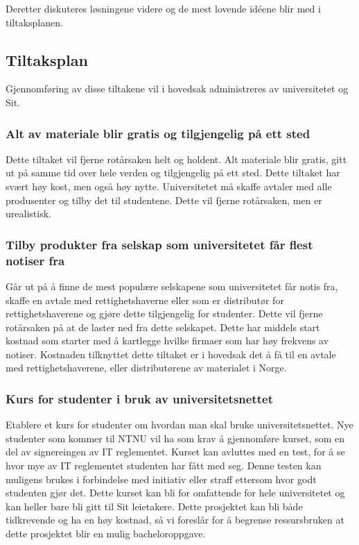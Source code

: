 Deretter diskuteres løsningene videre og de mest lovende idéene blir med i tiltaksplanen.

\subsection{Tiltaksplan}
Gjennomføring av disse tiltakene vil i hovedsak administreres av universitetet og Sit.

\subsubsection{Alt av materiale blir gratis og tilgjengelig på ett sted}
Dette tiltaket vil fjerne rotårsaken helt og holdent. Alt materiale blir gratis, gitt ut på samme tid over hele verden og tilgjengelig på ett sted. Dette tiltaket har svært høy kost, men også høy nytte. Universitetet må skaffe avtaler med alle produsenter og tilby det til studentene. Dette vil fjerne rotårsaken, men er urealistisk. 

\subsubsection{Tilby produkter fra selskap som universitetet får flest notiser fra}
Går ut på å finne de mest populære selskapene som universitetet får notis fra, skaffe en avtale med rettighetshaverne eller som er distributør for rettighetshaverene og gjøre dette tilgjengelig for studenter. Dette vil fjerne rotårsaken på at de laster ned fra dette selskapet. Dette har middels start kostnad som starter med å kartlegge hvilke firmaer som har høy frekvens av notiser. Kostnaden tilknyttet dette tiltaket er i hovedsak det å få til en avtale med rettighetshaverene, eller distributørene av materialet i Norge.

\subsubsection{Kurs for studenter i bruk av universitetsnettet}
Etablere et kurs for studenter om hvordan man skal bruke universitetsnettet. Nye studenter som kommer til NTNU vil ha som krav å gjennomføre kurset, som en del av signereingen av IT reglementet. Kurset kan avluttes med en test, for å se hvor mye av IT reglementet studenten har fått med seg. Denne testen kan muligens brukes i forbindelse med initiativ eller straff ettersom hvor godt studenten gjør det. Dette kurset kan bli for omfattende for hele universitetet og kan heller bare bli gitt til Sit leietakere. Dette prosjektet kan bli både tidkrevende og ha en høy kostnad, så vi foreslår for å begrense ressursbruken at dette prosjektet blir en mulig bacheloroppgave. 

